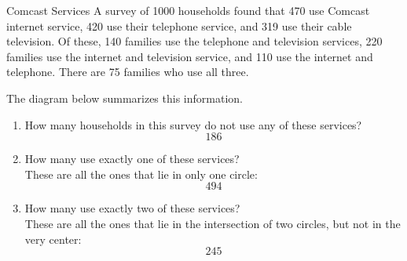 \begin{example}{Comcast Services}
A survey of 1000 households found that 470 use Comcast internet service, 420 use their telephone service, and 319 use their cable television.  Of these, 140 families use the telephone and television services, 220 families use the internet and television service, and 110 use the internet and telephone.  There are 75 families who use all three.

The diagram below summarizes this information.

\begin{center}
\end{center}

\begin{enumerate}
\item How many households in this survey do not use any of these services?
\[\boxed{186}\]
\item How many use exactly one of these services?\\

These are all the ones that lie in only one circle:
\[\boxed{494}\]

\item How many use exactly two of these services?\\

These are all the ones that lie in the intersection of two circles, but not in the very center:
\[\boxed{245}\]
\end{enumerate}
\end{example}